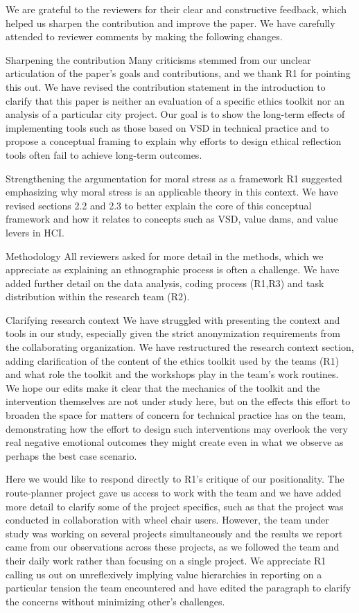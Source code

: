 We are grateful to the reviewers for their clear and constructive feedback, which helped us sharpen the contribution and improve the paper. We have carefully attended to reviewer comments by making the following changes. 

Sharpening the contribution
Many criticisms stemmed from our unclear articulation of the paper's goals and contributions, and we thank R1 for pointing this out. We have revised the contribution statement in the introduction to clarify that this paper is neither an evaluation of a specific ethics toolkit nor an analysis of a particular city project. Our goal is to show the long-term effects of implementing tools such as those based on VSD in technical practice and to propose a conceptual framing to explain why efforts to design ethical reflection tools often fail to achieve long-term outcomes.

Strengthening the argumentation for moral stress as a framework
R1 suggested emphasizing why moral stress is an applicable theory in this context. We have revised sections 2.2 and 2.3 to better explain the core of this conceptual framework and how it relates to concepts such as VSD, value dams, and value levers in HCI. 

Methodology
All reviewers asked for more detail in the methods, which we appreciate as explaining an ethnographic process is often a challenge. We have added further detail on the data analysis, coding process (R1,R3) and task distribution within the research team (R2). 

Clarifying research context
We have struggled with presenting the context and tools in our study, especially given the strict anonymization requirements from the collaborating organization. We have restructured the research context section, adding clarification of the content of the ethics toolkit used by the teams (R1) and what role the toolkit and the workshops play in the team's work routines. We hope our edits make it clear that the mechanics of the toolkit and the intervention themselves are not under study here, but on the effects this effort to broaden the space for matters of concern for technical practice has on the team, demonstrating how the effort to design such interventions may overlook the very real negative emotional outcomes they might create even in what we observe as perhaps the best case scenario. 

Here we would like to respond directly to R1's critique of our positionality. The route-planner project gave us access to work with the team and we have added more detail to clarify some of the project specifics, such as that the project was conducted in collaboration with wheel chair users. However, the team under study was working on several projects simultaneously and the results we report came from our observations across these projects, as we followed the team and their daily work rather than focusing on a single project. We appreciate R1 calling us out on unreflexively implying value hierarchies in reporting on a particular tension the team encountered and have edited the paragraph to clarify the concerns without minimizing other's challenges. 

